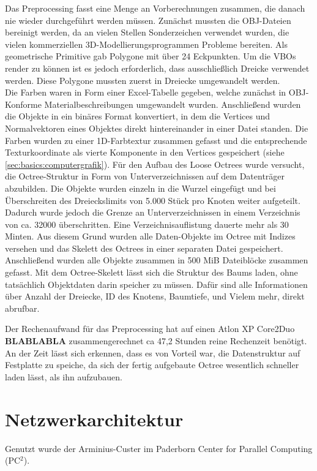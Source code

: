 Das Preprocessing fasst eine Menge an Vorberechnungen zusammen, die danach nie wieder durchgeführt werden müssen. Zunächst mussten die OBJ-Dateien bereinigt werden, da an vielen Stellen Sonderzeichen verwendet wurden, die vielen kommerziellen 3D-Modellierungsprogrammen Probleme bereiten. Als geometrische Primitive gab Polygone mit über 24 Eckpunkten. Um die VBOs render zu können ist es jedoch erforderlich, dass ausschließlich Dreicke verwendet werden. Diese Polygone mussten zuerst in Dreiecke umgewandelt werden. \\
Die Farben waren in Form einer Excel-Tabelle gegeben, welche zunächst in OBJ-Konforme Materialbeschreibungen umgewandelt wurden. Anschließend wurden die Objekte in ein binäres Format konvertiert, in dem die Vertices und Normalvektoren eines Objektes direkt hintereinander in einer Datei standen. Die Farben wurden zu einer 1D-Farbtextur zusammen gefasst und die entsprechende Texturkoordinate als vierte Komponente in den Vertices gespeichert (siehe \ref{sec:basics:computergrafik}). Für den Aufbau des Loose Octrees wurde versucht, die Octree-Struktur in Form von Unterverzeichnissen auf dem Datenträger abzubilden. Die Objekte wurden einzeln in die Wurzel eingefügt und bei Überschreiten des Dreieckslimits von 5.000 Stück pro Knoten weiter aufgeteilt. Dadurch wurde jedoch die Grenze an Unterverzeichnissen in einem Verzeichnis von ca. 32000 überschritten. Eine Verzeichnisauflistung dauerte mehr als 30 Minten. Aus diesem Grund wurden alle Daten-Objekte im Octree mit Indizes versehen und das Skelett des Octrees in einer separaten Datei gespeichert. Anschließend wurden alle Objekte zusammen in 500 MiB Dateiblöcke zusammen gefasst. Mit dem Octree-Skelett lässt sich die Struktur des Baums laden, ohne tatsächlich Objektdaten darin speicher zu müssen. Dafür sind alle Informationen über Anzahl der Dreiecke, ID des Knotens, Baumtiefe, und Vielem mehr, direkt abrufbar.

Der Rechenaufwand für das Preprocessing hat auf einen Atlon XP Core2Duo \textbf{BLABLABLA} zusammengerechnet ca 47,2 Stunden reine Rechenzeit benötigt. An der Zeit lässt sich erkennen, dass es von Vorteil war, die Datenstruktur auf Festplatte zu speiche, da sich der fertig aufgebaute Octree wesentlich schneller laden lässt, als ihn aufzubauen.

\section{Netzwerkarchitektur}
\label{sec:impl:netzwerkarchitektur}
%
Genutzt wurde der Arminius-Custer im Paderborn Center for Parallel Computing (PC$^2$)\cite{pc2}.

